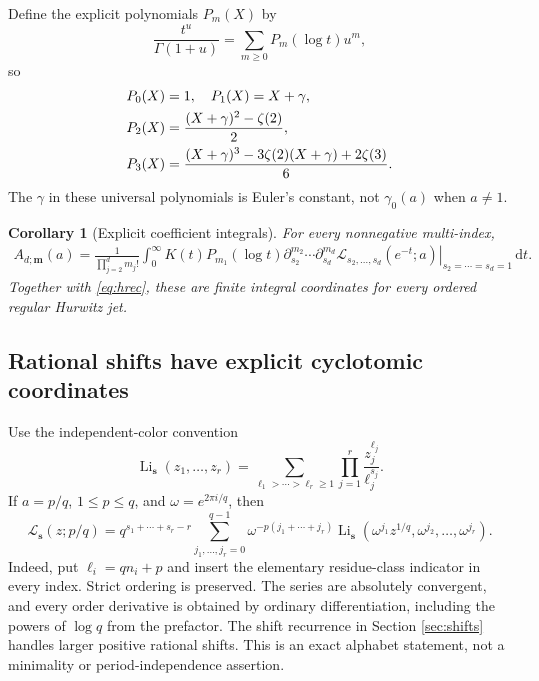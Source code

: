 \documentclass[11pt,a4paper]{article}
\numberwithin{equation}{section}
\newtheorem{corollary}[theorem]{Corollary}
\theoremstyle{definition}\newtheorem{definition}[theorem]{Definition}
\theoremstyle{remark}\newtheorem{remark}[theorem]{Remark}
\DeclareMathOperator{\Li}{Li}
\newcommand{\LL}{\mathcal L}
\newcommand{\dd}{\,\mathrm d}
\begin{document}
Define the explicit polynomials $P_m(X)$ by
\begin{equation}\label{eq:Pm}
 \frac{t^u}{\Gamma(1+u)}=\sum_{m\ge0}P_m(\log t)u^m,
\end{equation}
so
\begin{align}
 P_0(X)&=1,\quad P_1(X)=X+\gamma,\notag\\
 P_2(X)&=\frac{(X+\gamma)^2-\zeta(2)}2,\label{eq:Psmall}\\
 P_3(X)&=\frac{(X+\gamma)^3-3\zeta(2)(X+\gamma)+2\zeta(3)}6.
 \notag
\end{align}
The $\gamma$ in these universal polynomials is Euler's constant, not
$\gamma_0(a)$ when $a\ne1$.

\begin{corollary}[Explicit coefficient integrals]\label{cor:Acoeff}
For every nonnegative multi-index,
\begin{align}\label{eq:Acoeff}
 A_{d;\bm m}(a)=\frac1{\prod_{j=2}^{d}m_j!}
 \int_0^\infty K(t)P_{m_1}(\log t)
 \left.
 \partial_{s_2}^{m_2}\cdots\partial_{s_d}^{m_d}
 \LL_{s_2,\ldots,s_d}(e^{-t};a)
 \right|_{s_2=\cdots=s_d=1}\dd t.
\end{align}
Together with \eqref{eq:hrec}, these are finite integral coordinates for
every ordered regular Hurwitz jet.
\end{corollary}

\subsection{Rational shifts have explicit cyclotomic coordinates}
Use the independent-color convention
\[
 \Li_{\bm s}(z_1,\ldots,z_r)
   =\sum_{\ell_1>\cdots>\ell_r\ge1}
           \prod_{j=1}^{r}\frac{z_j^{\ell_j}}{\ell_j^{s_j}}.
\]
If $a=p/q$, $1\le p\le q$, and $\omega=e^{2\pi i/q}$, then
\begin{equation}\label{eq:rationalfilter}
 \boxed{\displaystyle
 \LL_{\bm s}(z;p/q)
 =q^{s_1+\cdots+s_r-r}
  \sum_{j_1,\ldots,j_r=0}^{q-1}\omega^{-p(j_1+\cdots+j_r)}
  \Li_{\bm s}(\omega^{j_1}z^{1/q},\omega^{j_2},\ldots,\omega^{j_r}).}
\end{equation}
Indeed, put $\ell_i=qn_i+p$ and insert the elementary residue-class
indicator in every index. Strict ordering is preserved. The series are
absolutely convergent, and every order derivative is obtained by
ordinary differentiation, including the powers of $\log q$ from the
prefactor. The shift recurrence in Section \ref{sec:shifts} handles larger
positive rational shifts. This is an exact alphabet statement, not a
minimality or period-independence assertion.
\end{document}
